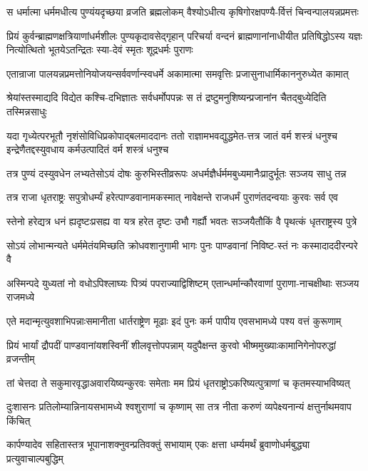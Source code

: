 \twolineshloka
{स धर्मात्मा धर्ममधीत्य पुण्यंयदृच्छया व्रजति ब्रह्मलोकम्}
{वैश्योऽधीत्य कृषिगोरक्षपण्यै-र्वित्तं चिन्वन्पालयन्नप्रमत्तः}


\threelineshloka
{प्रियं कुर्वन्ब्राह्मणक्षत्रियाणांधर्मशीलः पुण्यकृदावसेद्गृहान्}
{परिचर्या वन्दनं ब्राह्मणानांनाधीयीत प्रतिषिद्धोऽस्य यज्ञः}
{नित्योत्थितो भूतयेऽतन्द्रितः स्या-देवं स्मृतः शूद्रधर्मः पुराणः}


\twolineshloka
{एतान्राजा पालयन्नप्रमत्तोनियोजयन्सर्ववर्णान्स्वधर्मे}
{अकामात्मा समवृत्तिः प्रजासुनाधार्मिकाननुरुध्येत कामात्}


\twolineshloka
{श्रेयांस्तस्माद्यदि विद्येत कश्चि-दभिज्ञातः सर्वधर्मोपपन्नः}
{स तं द्रष्टुमनुशिष्यन्प्रजानांन चैतद्बुध्येदिति तस्मिन्नसाधुः}


\threelineshloka
{यदा गृध्येत्परभूतौ नृशंसोविधिप्रकोपाद्बलमाददानः}
{ततो राज्ञामभवद्युद्धमेत-त्तत्र जातं वर्म शस्त्रं धनुश्च}
{इन्द्रेणैतद्दस्युवधाय कर्मउत्पादितं वर्म शस्त्रं धनुश्च}


\twolineshloka
{तत्र पुण्यं दस्युवधेन लभ्यतेसोऽयं दोषः कुरुभिस्तीव्ररूपः}
{अधर्मज्ञैर्धर्ममबुध्यमानैःप्रादुर्भूतः सञ्जय साधु तन्न}


\twolineshloka
{तत्र राजा धृतराष्ट्रः सपुत्रोधर्म्यं हरेत्पाण्डवानामकस्मात्}
{नावेक्षन्ते राजधर्मं पुराणंतदन्वयाः कुरवः सर्व एव}


\twolineshloka
{स्तेनो हरेद्यत्र धनं ह्यदृष्टःप्रसह्य वा यत्र हरेत दृष्टः}
{उभौ गर्ह्यौ भवतः सञ्जयैतौकिं वै पृथत्कं धृतराष्ट्रस्य पुत्रे}


\twolineshloka
{सोऽयं लोभान्मन्यते धर्ममेतंयमिच्छति क्रोधवशानुगामी}
{भागः पुनः पाण्डवानां निविष्ट-स्तं नः कस्मादाददीरन्परे वै}


\twolineshloka
{अस्मिन्पदे युध्यतां नो वधोऽपिश्लाघ्यः पित्र्यं पपराज्याद्विशिष्टम्}
{एतान्धर्मान्कौरवाणां पुराणा-नाचक्षीथाः सञ्जय राजमध्ये}


\twolineshloka
{एते मदान्मृत्युवशाभिपन्नाःसमानीता धार्तराष्ट्रेण मूढाः}
{इदं पुनः कर्म पापीय एवसभामध्ये पश्य वत्तं कुरूणाम्}


\twolineshloka
{प्रियं भार्यां द्रौपदीं पाण्डवानांयशस्विनीं शीलवृत्तोपपन्नाम्}
{यदुपैक्षन्त कुरवो भीष्ममुख्याःकामानिगेनोपरुद्धां व्रजन्तीम्}


\twolineshloka
{तां चेत्तदा ते सकुमारवृद्धाअवारयिष्यन्कुरवः समेताः}
{मम प्रियं धृतराष्ट्रोऽकरिष्यत्पुत्राणां च कृतमस्याभविष्यत्}


\twolineshloka
{दुःशासनः प्रतिलोम्यान्निनायसभामध्ये श्वशुराणां च कृष्णाम्}
{सा तत्र नीता करुणं व्यपेक्ष्यनान्यं क्षत्तुर्नाथमवाप किंचित्}


\twolineshloka
{कार्पण्यादेव सहितास्तत्र भूपानाशक्नुवन्प्रतिवक्तुं सभायाम्}
{एकः क्षत्ता धर्म्यमर्थं ब्रुवाणोधर्मबुद्ध्या प्रत्युवाचाल्पबुद्धिम्}


